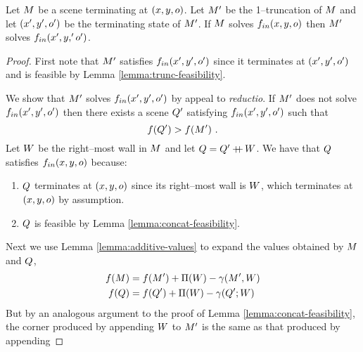 \begin{theorem}
  Let $\Scene$ be a scene terminating at $(x,y,\WallOrient)$. Let
  $\TruncScene$ be the 1--truncation of $\Scene$ and let
  $(x',y',\WallOrient')$ be the terminating state of
  $\TruncScene$. If $\Scene$ solves $\SubProbIN(x,y,\WallOrient)$
  then $\TruncScene$ solves $\SubProbIN(x',y,'\WallOrient')$.
  \label{thm:substructure}
\end{theorem}
\begin{proof}
  First note that $\TruncScene$ satisfies
  $\SubProbIN(x',y',\WallOrient')$ since it terminates at
  $(x',y',\WallOrient')$ and is feasible by Lemma
  \ref{lemma:trunc-feasibility}.

  We show that $\TruncScene$ solves $\SubProbIN(x',y',\WallOrient')$
  by appeal to \textit{reductio}. If $\TruncScene$ does not solve
  $\SubProbIN(x',y',\WallOrient')$ then there exists a scene
  $\CfTruncScene$ satisfying $\SubProbIN(x',y',\WallOrient')$ such
  that
  \begin{equation}
    \label{eq:cf-value}
    \Objective(\CfTruncScene) > \Objective(\TruncScene) ~.
  \end{equation}
  Let $\Wall$ be the right--most wall in $\Scene$ and let $\CfScene =
  \CfTruncScene \concat \Wall$. We have that $\CfScene$ satisfies
  $\SubProbIN(x,y,\WallOrient)$ because:
  \begin{enumerate}
    \item{$\CfScene$ terminates at $(x,y,\WallOrient)$ since its
      right--most wall is $\Wall$, which terminates at
      $(x,y,\WallOrient)$ by assumption.}
    \item{$\CfScene$ is feasible by Lemma
      \ref{lemma:concat-feasibility}.}
  \end{enumerate}
  Next we use Lemma \ref{lemma:additive-values} to expand the values
  obtained by $\Scene$ and $\CfScene$,
  \begin{equation}
  \begin{split}
    \label{eq:concat-values}
    \Objective(\Scene) &=
      \Objective(\TruncScene) + \WallPayoff(\Wall) - 
      \CornerPenalty(\TruncScene,\Wall) \\
    \Objective(\CfScene) &=
      \Objective(\CfTruncScene) + \WallPayoff(\Wall) - 
      \CornerPenalty(\CfTruncScene;\Wall)
  \end{split}
  \end{equation}
  But by an analogous argument to the proof of Lemma
  \ref{lemma:concat-feasibility}, the corner produced by appending
  $\Wall$ to $\TruncScene$ is the same as that produced by appending

\end{proof}
